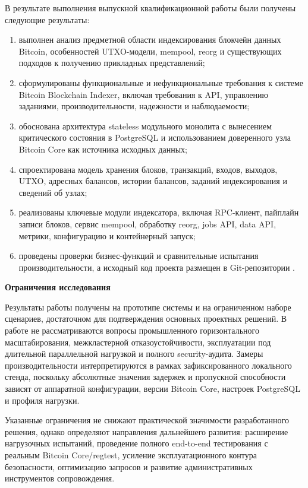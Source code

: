 В результате выполнения выпускной квалификационной работы были получены
следующие результаты:
\begin{enumerate}
    \item выполнен анализ предметной области индексирования блокчейн данных
    Bitcoin, особенностей UTXO-модели, mempool, reorg и существующих подходов к
    получению прикладных представлений;
    \item сформулированы функциональные и нефункциональные требования к системе
    Bitcoin Blockchain Indexer, включая требования к API, управлению заданиями,
    производительности, надежности и наблюдаемости;
    \item обоснована архитектура stateless модульного монолита с вынесением
    критического состояния в PostgreSQL и использованием доверенного узла
    Bitcoin Core как источника исходных данных;
    \item спроектирована модель хранения блоков, транзакций, входов, выходов,
    UTXO, адресных балансов, истории балансов, заданий индексирования и
    сведений об узлах;
    \item реализованы ключевые модули индексатора, включая RPC-клиент,
    пайплайн записи блоков, сервис mempool, обработку reorg, jobs API, data
    API, метрики, конфигурацию и контейнерный запуск;
    \item проведены проверки бизнес-функций и сравнительные испытания
    производительности, а исходный код проекта размещен в Git-репозитории
    \cite{project_github}.
\end{enumerate}

\textbf{Ограничения исследования}

Результаты работы получены на прототипе системы и на ограниченном наборе
сценариев, достаточном для подтверждения основных проектных решений. В работе
не рассматриваются вопросы промышленного горизонтального масштабирования,
межкластерной отказоустойчивости, эксплуатации под длительной параллельной
нагрузкой и полного security-аудита. Замеры производительности интерпретируются
в рамках зафиксированного локального стенда, поскольку абсолютные значения
задержек и пропускной способности зависят от аппаратной конфигурации, версии
Bitcoin Core, настроек PostgreSQL и профиля нагрузки.

Указанные ограничения не снижают практической значимости разработанного
решения, однако определяют направления дальнейшего развития: расширение
нагрузочных испытаний, проведение полного end-to-end тестирования с реальным
Bitcoin Core/regtest, усиление эксплуатационного контура безопасности,
оптимизацию запросов и развитие административных инструментов сопровождения.
